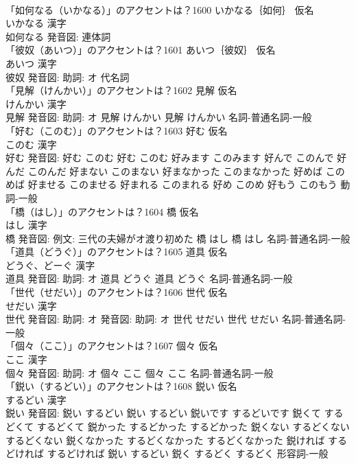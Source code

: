 \documentclass[8pt]{extreport}
\begin{document}
\begin{CJK}{UTF8}{min}
\\	「如何なる（いかなる）」のアクセントは？1600	いかなる｛如何｝ 仮名　
\\	いかなる 漢字　
\\	如何なる 発音図:							連体詞 
\\	「彼奴（あいつ）」のアクセントは？1601	あいつ｛彼奴｝ 仮名　
\\	あいつ 漢字　
\\	彼奴 発音図: 助詞: オ							代名詞 
\\	「見解（けんかい）」のアクセントは？1602	見解 仮名　
\\	けんかい 漢字　
\\	見解 発音図: 助詞: オ	見解 けんかい		見解 けんかい				名詞-普通名詞-一般 
\\	「好む（このむ）」のアクセントは？1603	好む 仮名　
\\	このむ 漢字　
\\	好む 発音図:	好む このむ		好む このむ 好みます このみます 好んで このんで 好んだ このんだ 好まない このまない 好まなかった このまなかった 好めば このめば 好ませる このませる 好まれる このまれる 好め このめ 好もう このもう				動詞-一般 
\\	「橋（はし）」のアクセントは？1604	橋 仮名　
\\	はし 漢字　
\\	橋 発音図: 例文: 三代の夫婦がオ渡り初めた	橋 はし		橋 はし				名詞-普通名詞-一般 
\\	「道具（どうぐ）」のアクセントは？1605	道具 仮名　
\\	どうぐ、どーぐ 漢字　
\\	道具 発音図: 助詞: オ	道具 どうぐ		道具 どうぐ				名詞-普通名詞-一般 
\\	「世代（せだい）」のアクセントは？1606	世代 仮名　
\\	せだい 漢字　
\\	世代 発音図: 助詞: オ 発音図: 助詞: オ	世代 せだい		世代 せだい				名詞-普通名詞-一般 
\\	「個々（ここ）」のアクセントは？1607	個々 仮名　
\\	ここ 漢字　
\\	個々 発音図: 助詞: オ	個々 ここ		個々 ここ				名詞-普通名詞-一般 
\\	「鋭い（するどい）」のアクセントは？1608	鋭い 仮名　
\\	するどい 漢字　
\\	鋭い 発音図:	鋭い するどい		鋭い するどい 鋭いです するどいです 鋭くて するどくて するどくて 鋭かった するどかった するどかった 鋭くない するどくない するどくない 鋭くなかった するどくなかった するどくなかった 鋭ければ するどければ するどければ 鋭い するどい 鋭く するどく するどく				形容詞-一般 

\end{CJK}
\end{document}
